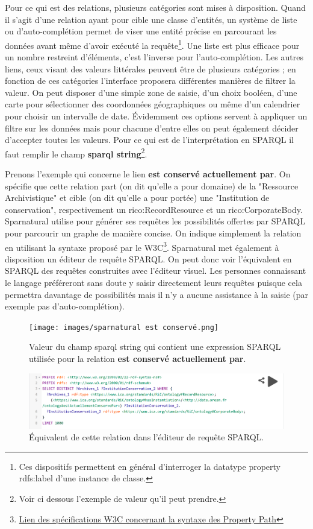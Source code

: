 Pour ce qui est des relations, plusieurs catégories sont mises à disposition. Quand il s'agit d'une relation ayant pour cible une classe d'entités, un système de liste ou d'auto-complétion permet de viser une entité précise en parcourant les données avant même d'avoir exécuté la requête\footnote{Ces dispositifs permettent en général d'interroger la datatype property rdfs:label d'une instance de classe.}. Une liste est plus efficace pour un nombre restreint d'éléments, c'est l'inverse pour l'auto-complétion. Les autres liens, ceux visant des valeurs littérales peuvent être de plusieurs catégories ; en fonction de ces catégories l'interface proposera différentes manières de filtrer la valeur. On peut disposer d'une simple zone de saisie, d'un choix booléen, d'une carte pour sélectionner des coordonnées géographiques ou même d'un calendrier pour choisir un intervalle de date. Évidemment ces options servent à appliquer un filtre sur les données mais pour chacune d'entre elles on peut également décider d'accepter toutes les valeurs. Pour ce qui est de l'interprétation en SPARQL il faut remplir le champ \textbf{sparql string}\footnote{Voir ci dessous l'exemple de valeur qu'il peut prendre.}. 
\par
Prenons l'exemple qui concerne le lien \textbf{est conservé actuellement par}. On spécifie que cette relation part (on dit qu'elle a pour domaine)  de la "Ressource Archivistique" et cible (on dit qu'elle a pour portée) une "Institution de conservation", respectivement un rico:RecordResource et un rico:CorporateBody. Sparnatural utilise pour générer ses requêtes les possibilités offertes par SPARQL pour parcourir un graphe de manière concise. On indique simplement la relation en utilisant la syntaxe proposé par le W3C\footnote{\href{https://www.w3.org/TR/sparql11-query/\#propertypaths}{Lien des spécifications W3C concernant la syntaxe des Property Path}}. Sparnatural met également à disposition un éditeur de requête SPARQL. On peut donc voir l'équivalent en SPARQL des requêtes construites avec l'éditeur visuel. Les personnes connaissant le langage préféreront sans doute y saisir directement leurs requêtes puisque cela permettra davantage de possibilités mais il n'y a aucune assistance à la saisie (par exemple pas d'auto-complétion).

\begin{figure}[h]
    \centering
    \texttt{[image: images/sparnatural est conservé.png]}
    \caption{Valeur du champ sparql string qui contient une expression SPARQL utilisée pour la relation \textbf{est conservé actuellement par}.}
    \label{fig:lien-sparnatural-conserve}
\end{figure}
\begin{figure}[h]
    \centering
    \includegraphics[width=1\linewidth]{images/equivalent sparql.png}
    \caption{Équivalent de cette relation dans l'éditeur de requête SPARQL.}
    \label{fig:lien-sparql-conserve}
\end{figure}

